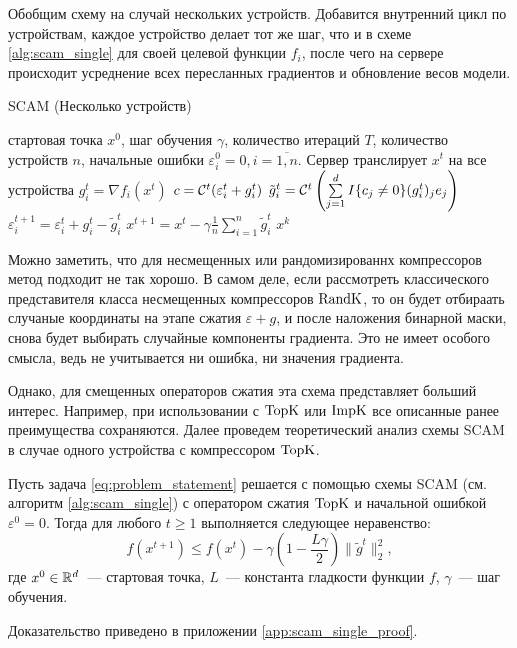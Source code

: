     Обобщим схему на случай нескольких устройств. Добавится внутренний цикл по устройствам, каждое устройство делает тот же шаг, что и в схеме \ref{alg:scam_single} для своей целевой функции $f_i$, после чего на сервере происходит усреднение всех пересланных градиентов и обновление весов модели.

    \begin{algorithm}[ht]
        \caption{SCAM (Несколько устройств)}
        \label{alg:scam_multi}
        \begin{algorithmic}[1]
             стартовая точка $x^0$, шаг обучения $\gamma$, количество итераций $T$, количество устройств $n$, начальные ошибки $\varepsilon_i^0 = 0, i = \overline{1, n}$.
                \STATE Сервер транслирует $x^t$ на все устройства
                    \STATE $g_i^t = \nabla f_i(x^t)$
                    \STATE $c = {\cal C}^t (\varepsilon_i^t + g_i^t)$
                    \STATE $\tilde{g}_i^t = {\cal C}^t \left(\sum\limits_{j=1}^{d} I\{c_j \neq 0\} (g_i^t)_j e_j\right)$
                    \STATE $\varepsilon_i^{t + 1} = \varepsilon_i^{t} + g_i^t - \tilde{g}_i^t$
                \ENDFOR
                \STATE $x^{t+1} = x^t - \gamma \frac{1}{n} \sum\limits_{i = 1}^n \tilde{g}_i^t$
            \ENDFOR
             $x^k$
        \end{algorithmic}
    \end{algorithm}

    Можно заметить, что для несмещенных или рандомизированнх компрессоров метод подходит не так хорошо. В самом деле, если рассмотреть классического представителя класса несмещенных компрессоров $\operatorname{RandK}$, то он будет отбираать случаные координаты на этапе сжатия $\varepsilon + g$, и после наложения бинарной маски, снова будет выбирать случайные компоненты градиента. Это не имеет особого смысла, ведь не учитывается ни ошибка, ни значения градиента.

    Однако, для смещенных операторов сжатия эта схема представляет больший интерес. Например, при использовании с $\operatorname{TopK}$ или $\operatorname{ImpK}$ все описанные ранее преимущества сохраняются. Далее проведем теоретический анализ схемы SCAM в случае одного устройства с компрессором $\operatorname{TopK}$.

    \begin{theorem}\label{th:scam_single}
        Пусть задача \eqref{eq:problem_statement} решается с помощью схемы SCAM (см. алгоритм \ref{alg:scam_single}) с оператором сжатия $\operatorname{TopK}$ и начальной ошибкой $\varepsilon^0 = 0$. Тогда для любого $t \geq 1$ выполняется следующее неравенство:
        \begin{equation}
            f(x^{t + 1}) \leq f(x^t) - \gamma \left(1 - \frac{L \gamma}{2}\right) \|\tilde{g}^t\|_2^2,
        \end{equation}
        где $x^0 \in \mathbb{R}^d$~--- стартовая точка, $L$~--- константа гладкости функции $f$, $\gamma$~--- шаг обучения.
    \end{theorem}
    Доказательство приведено в приложении \ref{app:scam_single_proof}.
    
